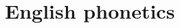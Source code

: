 \documentclass[12pt,a4paper]{book}
\begin{document}

% 

% 

 
\part{English phonetics}




%
\end{document}
